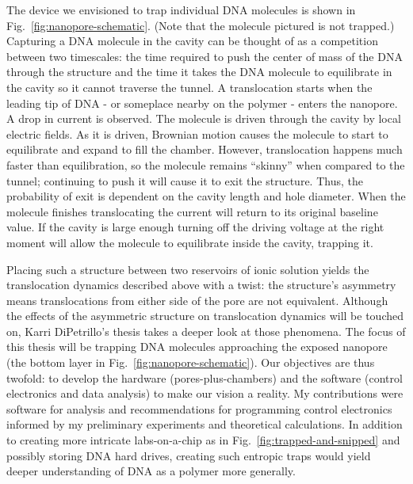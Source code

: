 \documentclass[aps,prl,preprint,groupedaddress]{revtex4}
\begin{document}
The device we envisioned to trap individual DNA molecules is shown in Fig.~\ref{fig:nanopore-schematic}.
(Note that the molecule pictured is not trapped.) Capturing a DNA molecule in the cavity can be thought of as a competition between two timescales: the time required to push the center of mass of the DNA through the structure and the time it takes the DNA molecule to equilibrate in the cavity so it cannot traverse the tunnel.
A translocation starts when the leading tip of DNA  - or someplace nearby on the polymer - enters the nanopore.
A drop in current is observed.
The molecule is driven through the cavity by local electric fields.
As it is driven, Brownian motion causes the molecule to start to equilibrate and expand to fill the chamber.
However, translocation happens much faster than equilibration, so the molecule remains ``skinny'' when compared to the tunnel; continuing to push it will cause it to exit the structure.
Thus, the probability of exit is dependent on the cavity length and hole diameter.
When the molecule finishes translocating the current will return to its original baseline value.
If the cavity is large enough turning off the driving voltage at the right moment will allow the molecule to equilibrate inside the cavity, trapping it.

Placing such a structure between two reservoirs of ionic solution yields the translocation dynamics described above with a twist: the structure’s asymmetry means translocations from either side of the pore are not equivalent.
Although the effects of the asymmetric structure on translocation dynamics will be touched on, Karri DiPetrillo's thesis takes a deeper look at those phenomena.
The focus of this thesis will be trapping DNA molecules approaching the exposed nanopore (the bottom layer in Fig.~\ref{fig:nanopore-schematic}).
Our objectives are thus twofold: to develop the hardware (pores-plus-chambers) and the software (control electronics and data analysis) to make our vision a reality.
My contributions were software for analysis and recommendations for programming control electronics informed by my preliminary experiments and theoretical calculations.
In addition to creating more intricate labs-on-a-chip as in Fig.~\ref{fig:trapped-and-snipped} and possibly storing DNA hard drives, creating such entropic traps would yield deeper understanding of DNA as a polymer more generally.
\end{document}
